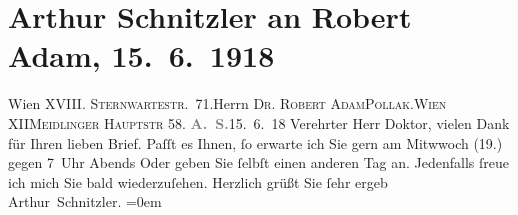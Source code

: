 

               \section[Arthur Schnitzler an Robert Adam, 15. 6. 1918]{ Arthur Schnitzler an Robert Adam, 15. 6. 1918}\nopagebreak{}\rehead{ }\begin{ledgroupsized}[t]{13cm}\normalsize\beginnumbering{} \toendnotes[C]{\smallbreak\pagebreak[2]} 
\pstart{}{\pb}Wien XVIII. \textsc{Sternwartestr}. 71.\pend{}{\bigskip}\pstart{}Herrn \textsc{Dr. Robert Adam}\pend{}\pstart{}\textsc{Pollak}.\pend{}\pstart{}\textsc{Wien} XII\pend{}\pstart{}\textsc{Meidlinger Hauptstr} 58.\pend{}{\bigskip}\pstart
           \noindent{}{\pb}\textcolor{gray}{\textbf{A. S.}}\hfill 15. 6. 18\pend
           \pstart{}Verehrter Herr Doktor, \pend\pstart
           vielen Dank für Ihren lieben Brief. Paſſt es Ihnen, ſo erwarte ich Sie gern am
                        Mitwwoch (19.) gegen 7 Uhr Abends Oder geben Sie
                    ſelbſt einen anderen Tag an. Jedenfalls ſreue ich mich Sie bald
                    wiederzuſehen.\pend
           \pstart
           Herzlich grüßt Sie ſehr ergeb{\\[\baselineskip]}\spacefill\mbox{Arthur Schnitzler.}\pend
           \leftskip=0em{}          \endnumbering{}\end{ledgroupsized}  \newcommand{\dateiname}{L02288}\newcommand{\titel}{Arthur Schnitzler an Robert Adam, 15. 6. 1918}\newcommand{\editorInnen}{Martin Anton Müller und Gerd-Hermann Susen}
      